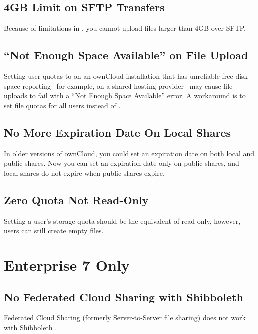 \documentclass[letterpaper,10pt,english]{sphinxmanual}
\begin{document}
\subsection{4GB Limit on SFTP Transfers}
\label{release_notes:gb-limit-on-sftp-transfers}
Because of limitations in , you cannot upload files larger than
4GB over SFTP.


\subsection{``Not Enough Space Available'' on File Upload}
\label{release_notes:not-enough-space-available-on-file-upload}
Setting user quotas to  on an ownCloud installation that has
unreliable free disk space reporting-- for example, on a shared hosting
provider-- may cause file uploads to fail with a ``Not Enough Space Available''
error. A workaround is to set file quotas for all users instead of
.


\subsection{No More Expiration Date On Local Shares}
\label{release_notes:no-more-expiration-date-on-local-shares}
In older versions of ownCloud, you could set an expiration date on both local
and public shares. Now you can set an expiration date only on public shares,
and
local shares do not expire when public shares expire.


\subsection{Zero Quota Not Read-Only}
\label{release_notes:zero-quota-not-read-only}
Setting a user's storage quota should be the equivalent of read-only, however,
users can
still create empty files.


\section{Enterprise 7 Only}
\label{release_notes:enterprise-7-only}

\subsection{No Federated Cloud Sharing with Shibboleth}
\label{release_notes:id2}
Federated Cloud Sharing (formerly Server-to-Server file sharing) does not work
with Shibboleth .
\end{document}
